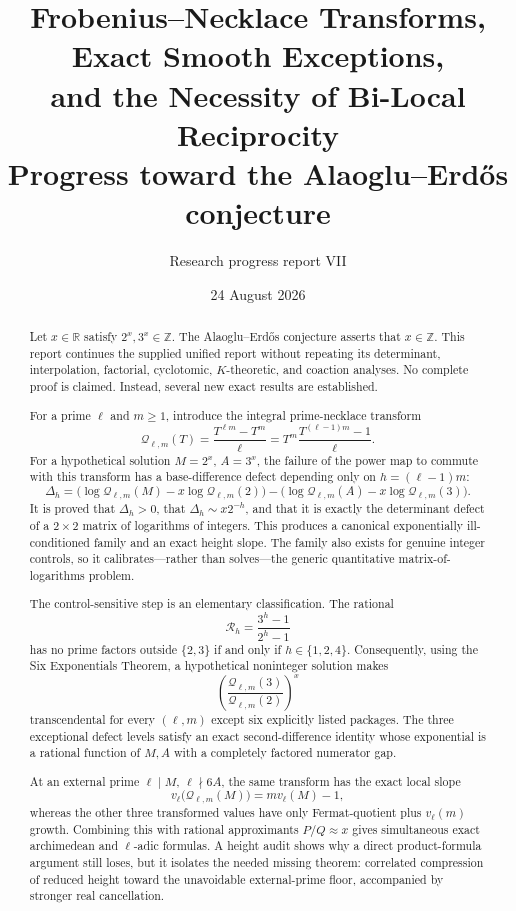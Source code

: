 \documentclass[11pt]{article}
\title{\textbf{Frobenius--Necklace Transforms, Exact Smooth Exceptions,\\
and the Necessity of Bi-Local Reciprocity}\\[0.6em]
\large Progress toward the Alaoglu--Erd\H{o}s conjecture}
\author{Research progress report VII}
\date{24 August 2026}
\numberwithin{equation}{section}
\theoremstyle{definition}
\theoremstyle{remark}
\newcommand{\Z}{\mathbb Z}
\newcommand{\R}{\mathbb R}
\begin{document}
\maketitle

\begin{abstract}
Let $x\in\R$ satisfy $2^x,3^x\in\Z$.  The Alaoglu--Erd\H{o}s conjecture asserts that $x\in\Z$.  This report continues the supplied unified report without repeating its determinant, interpolation, factorial, cyclotomic, $K$-theoretic, and coaction analyses.  No complete proof is claimed.  Instead, several new exact results are established.

For a prime $\ell$ and $m\geq1$, introduce the integral prime-necklace transform
\[
  \mathcal Q_{\ell,m}(T)=\frac{T^{\ell m}-T^m}{\ell}
  =T^m\frac{T^{(\ell-1)m}-1}{\ell}.
\]
For a hypothetical solution $M=2^x$, $A=3^x$, the failure of the power map to commute with this transform has a base-difference defect depending only on $h=(\ell-1)m$:
\[
  \Delta_h
  =\bigl(\log\mathcal Q_{\ell,m}(M)-x\log\mathcal Q_{\ell,m}(2)\bigr)
   -\bigl(\log\mathcal Q_{\ell,m}(A)-x\log\mathcal Q_{\ell,m}(3)\bigr).
\]
It is proved that $\Delta_h>0$, that $\Delta_h\sim x2^{-h}$, and that it is exactly the determinant defect of a $2\times2$ matrix of logarithms of integers.  This produces a canonical exponentially ill-conditioned family and an exact height slope.  The family also exists for genuine integer controls, so it calibrates---rather than solves---the generic quantitative matrix-of-logarithms problem.

The control-sensitive step is an elementary classification.  The rational
\[
  \mathcal R_h=\frac{3^h-1}{2^h-1}
\]
has no prime factors outside $\{2,3\}$ if and only if $h\in\{1,2,4\}$.  Consequently, using the Six Exponentials Theorem, a hypothetical noninteger solution makes
\[
  \left(\frac{\mathcal Q_{\ell,m}(3)}{\mathcal Q_{\ell,m}(2)}\right)^x
\]
transcendental for every $(\ell,m)$ except six explicitly listed packages.  The three exceptional defect levels satisfy an exact second-difference identity whose exponential is a rational function of $M,A$ with a completely factored numerator gap.

At an external prime $\ell\mid M$, $\ell\nmid 6A$, the same transform has the exact local slope
\[
  v_\ell\bigl(\mathcal Q_{\ell,m}(M)\bigr)=m v_\ell(M)-1,
\]
whereas the other three transformed values have only Fermat-quotient plus $v_\ell(m)$ growth.  Combining this with rational approximants $P/Q\approx x$ gives simultaneous exact archimedean and $\ell$-adic formulas.  A height audit shows why a direct product-formula argument still loses, but it isolates the needed missing theorem: correlated compression of reduced height toward the unavoidable external-prime floor, accompanied by stronger real cancellation.


\end{abstract}
\end{document}
